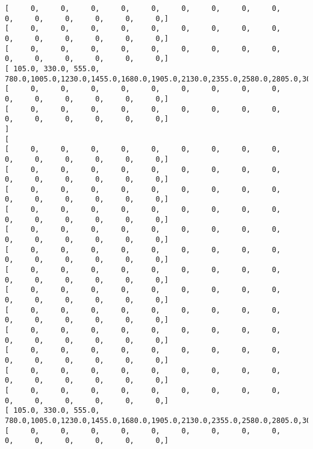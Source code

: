 \documentclass[11pt]{article}
\begin{document}
\begin{Verbatim}[commandchars=\\\{\}]
[      0,      0,      0,      0,      0,      0,      0,      0,      0,      0,      0,      0,      0,      0,      0, ]
[      0,      0,      0,      0,      0,      0,      0,      0,      0,      0,      0,      0,      0,      0,      0, ]
[      0,      0,      0,      0,      0,      0,      0,      0,      0,      0,      0,      0,      0,      0,      0, ]
[  105.0,  330.0,  555.0,  780.0, 1005.0, 1230.0, 1455.0, 1680.0, 1905.0, 2130.0, 2355.0, 2580.0, 2805.0, 3030.0, 3255.0, ]
[      0,      0,      0,      0,      0,      0,      0,      0,      0,      0,      0,      0,      0,      0,      0, ]
[      0,      0,      0,      0,      0,      0,      0,      0,      0,      0,      0,      0,      0,      0,      0, ]
]
[
[      0,      0,      0,      0,      0,      0,      0,      0,      0,      0,      0,      0,      0,      0,      0, ]
[      0,      0,      0,      0,      0,      0,      0,      0,      0,      0,      0,      0,      0,      0,      0, ]
[      0,      0,      0,      0,      0,      0,      0,      0,      0,      0,      0,      0,      0,      0,      0, ]
[      0,      0,      0,      0,      0,      0,      0,      0,      0,      0,      0,      0,      0,      0,      0, ]
[      0,      0,      0,      0,      0,      0,      0,      0,      0,      0,      0,      0,      0,      0,      0, ]
[      0,      0,      0,      0,      0,      0,      0,      0,      0,      0,      0,      0,      0,      0,      0, ]
[      0,      0,      0,      0,      0,      0,      0,      0,      0,      0,      0,      0,      0,      0,      0, ]
[      0,      0,      0,      0,      0,      0,      0,      0,      0,      0,      0,      0,      0,      0,      0, ]
[      0,      0,      0,      0,      0,      0,      0,      0,      0,      0,      0,      0,      0,      0,      0, ]
[      0,      0,      0,      0,      0,      0,      0,      0,      0,      0,      0,      0,      0,      0,      0, ]
[      0,      0,      0,      0,      0,      0,      0,      0,      0,      0,      0,      0,      0,      0,      0, ]
[      0,      0,      0,      0,      0,      0,      0,      0,      0,      0,      0,      0,      0,      0,      0, ]
[      0,      0,      0,      0,      0,      0,      0,      0,      0,      0,      0,      0,      0,      0,      0, ]
[  105.0,  330.0,  555.0,  780.0, 1005.0, 1230.0, 1455.0, 1680.0, 1905.0, 2130.0, 2355.0, 2580.0, 2805.0, 3030.0, 3255.0, ]
[      0,      0,      0,      0,      0,      0,      0,      0,      0,      0,      0,      0,      0,      0,      0, ]

\end{Verbatim}
\end{document}
